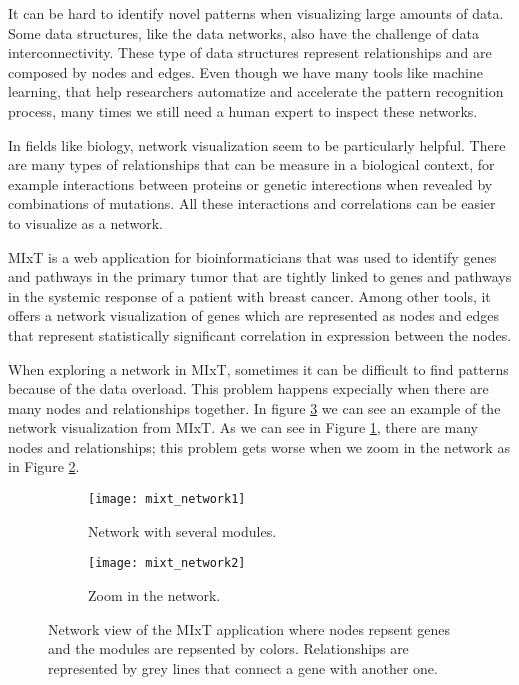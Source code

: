 It can be hard to identify novel patterns when visualizing large amounts of data. Some data structures, like the data networks, also have the challenge of data interconnectivity. These type of data structures represent relationships and are composed by nodes and edges. Even though we have many tools like machine learning, that help researchers automatize and accelerate the pattern recognition process, many times we still need a human expert to inspect these networks\cite{network_expert}.

In fields like biology, network visualization seem to be particularly helpful\cite{pujana_network_modeling}\cite{fraser_view_function}. There are many types of relationships that can be measure in a biological context, for example interactions between proteins or genetic interections when revealed by combinations of mutations. All these interactions and correlations can be easier to visualize as a network\cite{merico_visualization}.

MIxT\cite{fjukstad_dumeaux_olsen_lund_hallett_bongo_2017} is a web application for bioinformaticians that was used to identify genes and pathways in the primary tumor that are tightly linked to genes and pathways in the systemic response of a patient with breast cancer\cite{dumeaux_fjukstad_interactions_tumor_blood}. Among other tools, it offers a network visualization of genes which are represented as nodes and edges that represent statistically significant correlation in expression between the nodes.

When exploring a network in MIxT, sometimes it can be difficult to find patterns because of the data overload. This problem happens expecially when there are many nodes and relationships together. In figure \ref{fig:mixt_network} we can see an example of the network visualization from MIxT. As we can see in Figure \ref{fig:mixt_network1}, there are many nodes and relationships; this problem gets worse when we zoom in the network as in Figure \ref{fig:mixt_network_zoom}.

\begin{figure}[h!]
    \centering%
    \begin{subfigure}[t]{0.5\textwidth}
        \centering%
        \texttt{[image: mixt\_network1]}
        \caption{Network with several modules.}
        \label{fig:mixt_network1}
    \end{subfigure}%
    \begin{subfigure}[t]{0.5\textwidth}
        \centering%
        \texttt{[image: mixt\_network2]}
        \caption{Zoom in the network.}
        \label{fig:mixt_network_zoom}
    \end{subfigure}

    \caption{Network view of the MIxT application where nodes repsent genes and the modules are repsented by colors. Relationships are represented by grey lines that connect a gene with another one.}
    \label{fig:mixt_network}
\end{figure}

